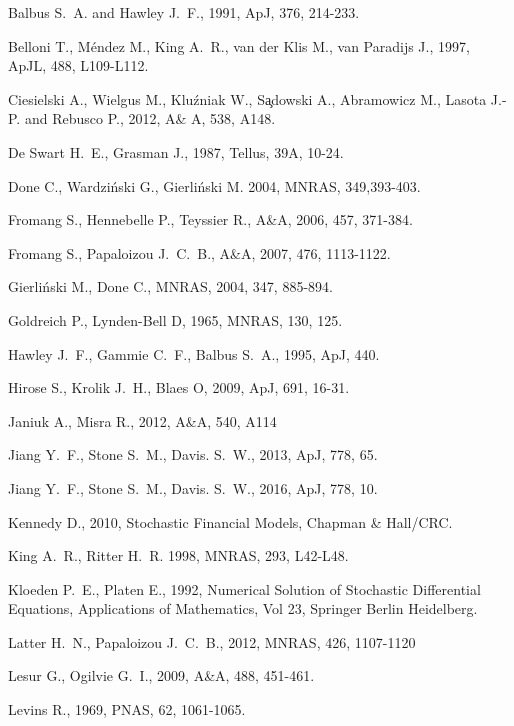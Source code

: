 \documentclass[useAMS]{mn2e}
\begin{document}

\begin{thebibliography}{40}

Balbus S.~A. and Hawley J.~F., 1991, ApJ, 376, 214-233.


Belloni T., M{\'e}ndez M., King A.~R., van der Klis M., van Paradijs J., 1997, ApJL, 488, L109-L112.


Ciesielski A., Wielgus M., Klu{\'z}niak W., S{\c a}dowski A., Abramowicz M., Lasota J.-P. and 
Rebusco P., 2012, A\& A, 538, A148.

De Swart H.~E., Grasman J., 1987, Tellus, 39A, 10-24.

Done C., Wardzi\'{n}ski G., Gierli\'{n}ski M. 2004, MNRAS, 349,393-403.

Fromang S., Hennebelle P., Teyssier R., A\&A,  2006, 457, 371-384.


Fromang S., Papaloizou J.~C.~B., A\&A, 2007, 476, 1113-1122.



Gierli\'{n}ski M., Done C., MNRAS, 2004, 347, 885-894.

Goldreich P., Lynden-Bell D, 1965, MNRAS, 130, 125.

Hawley J.~F., Gammie C.~F., Balbus S.~A., 1995, ApJ, 440.

Hirose S., Krolik J.~H., Blaes O, 2009, ApJ, 691, 16-31.

Janiuk A., Misra R., 2012, A\&A, 540, A114

Jiang Y.~F., Stone S.~M., Davis. S.~W., 2013, ApJ, 778, 65.

Jiang Y.~F., Stone S.~M., Davis. S.~W., 2016, ApJ, 778, 10.

Kennedy D., 2010, Stochastic Financial Models, Chapman \& Hall/CRC.

King A.~R., Ritter H.~R. 1998, MNRAS, 293, L42-L48.

Kloeden P.~E., Platen E., 1992, Numerical Solution of Stochastic Differential Equations, Applications of Mathematics, Vol 23, Springer Berlin Heidelberg. 

Latter H.~N., Papaloizou J.~C.~B., 2012, MNRAS, 426, 1107-1120

Lesur G., Ogilvie G.~I., 2009, A\&A, 488, 451-461.

Levins R., 1969, PNAS, 62, 1061-1065.


\end{thebibliography}
\end{document}
